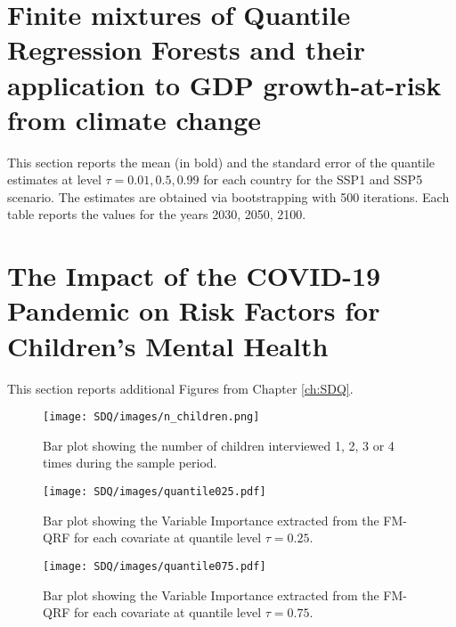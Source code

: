 

\chapter{Finite mixtures of Quantile
Regression Forests and their
application to GDP growth-at-risk
from climate change}


This section reports the mean (in bold) and the standard error of the quantile estimates at level $\tau=0.01, 0.5, 0.99$ for each country for the SSP1 and SSP5 scenario. The estimates are obtained via bootstrapping with 500 iterations. Each table reports the values for the years 2030, 2050, 2100.






\chapter{The Impact of the COVID-19 Pandemic on Risk Factors for Children’s Mental Health}\label{app:SDQ}

This section reports additional Figures from Chapter \ref{ch:SDQ}.



\begin{figure}[h]
    \centering
\texttt{[image: SDQ/images/n\_children.png]}
    \caption{Bar plot showing the number of children interviewed 1, 2, 3 or 4 times during the sample period. }
    \label{fig:n_children}
\end{figure}

\begin{figure}[h]
    \centering
\texttt{[image: SDQ/images/quantile025.pdf]}
    \caption{Bar plot showing the Variable Importance extracted from the FM-QRF for each covariate at quantile level $\tau=0.25$. }
    \label{fig:quantile025}
\end{figure}

\begin{figure}[h]
    \centering
\texttt{[image: SDQ/images/quantile075.pdf]}
    \caption{Bar plot showing the Variable Importance extracted from the FM-QRF for each covariate at quantile level $\tau=0.75$.}
    \label{fig:quantile075}
\end{figure}




